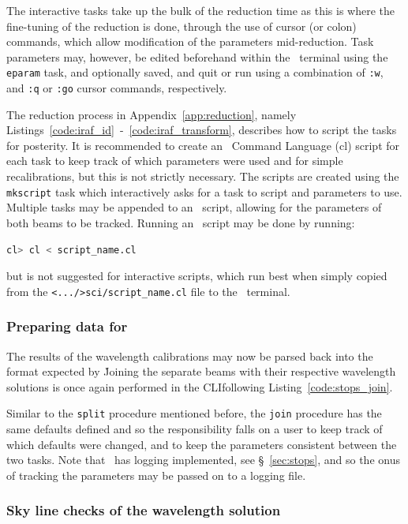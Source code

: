 The interactive tasks take up the bulk of the reduction time as this is where the fine-tuning of the reduction is done, through the use of cursor (or colon) commands, which allow modification of the parameters mid-reduction. Task parameters may, however, be edited beforehand within the \iraf\ terminal using the \texttt{eparam} task, and optionally saved, and quit or run using a combination of \texttt{:w}, and \texttt{:q} or \texttt{:go} cursor commands, respectively.

The reduction process in Appendix~\ref{app:reduction}, namely Listings~\ref{code:iraf_id}~-~\ref{code:iraf_transform}, describes how to script the tasks for posterity. It is recommended to create an \iraf\ Command Language (cl) script for each task to keep track of which parameters were used and for simple recalibrations, but this is not strictly necessary. The scripts are created using the \texttt{mkscript} task which interactively asks for a task to script and parameters to use. Multiple tasks may be appended to an \iraf\ script, allowing for the parameters of both beams to be tracked. Running an \iraf\ script may be done by running:
\begin{lstlisting}[language=bash]
cl> cl < script_name.cl
\end{lstlisting}
{\parskip=0pt but} is not suggested for interactive scripts, which run best when simply copied from the \texttt{<.../>sci/script\_name.cl} file to the \iraf\ terminal.

\subsubsection{Preparing data for \polsalt}

The results of the wavelength calibrations may now be parsed back into the format expected by \polsalt\. Joining the separate beams with their respective wavelength solutions is once again performed in the \gls{CLI}following Listing~\ref{code:stops_join}.

Similar to the \texttt{split} procedure mentioned before, the \texttt{join} procedure has the same defaults defined and so the responsibility falls on a user to keep track of which defaults were changed, and to keep the parameters consistent between the two tasks. Note that \stops\ has logging implemented, see \S~\ref{sec:stops}, and so the onus of tracking the parameters may be passed on to a logging file.

\subsubsection{Sky line checks of the wavelength solution}

